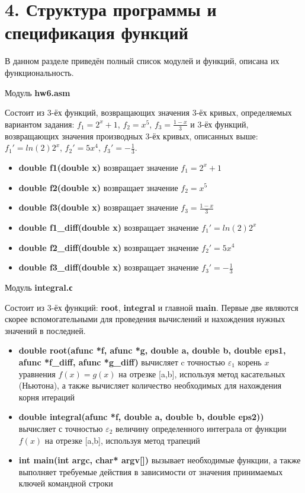\documentclass[a4paper,12pt,titlepage,finall]{article}
\begin{document}
\newpage

\section{4. Структура программы и спецификация функций}
В данном разделе приведён полный список модулей и функций, описана их функциональность.
\newline

\item{Модуль {\bf \ttfamily hw6.asm}}

Состоит из 3-ёх функций, возвращающих значения 3-ёх кривых, определяемых вариантом задания: $f_{1} = 2^x + 1$, $f_{2} = x^5$, $f_{3} = \frac{1-x}{3}$ и 3-ёх функций, возвращающих значения производных 3-ёх кривых, описанных выше: $f_{1}' = ln(2)2^x$, $f_{2}' = 5x^4$, $f_{3}' = -\frac{1}{3}$.
\begin{itemize}
    \item {\bf \ttfamily double f1(double x)} возвращает значение $f_{1} = 2^x + 1$
    \item {\bf \ttfamily double f2(double x)} возвращает значение $f_{2} = x^5$
    \item {\bf \ttfamily double f3(double x)} возвращает значение $f_{3} = \frac{1-x}{3}$
    \item {\bf \ttfamily double f1\_diff(double x)} возвращает значение $f_{1}' = ln(2)2^x$
    \item {\bf \ttfamily double f2\_diff(double x)} возвращает значение $f_{2}' = 5x^4$
    \item {\bf \ttfamily double f3\_diff(double x)} возвращает значение $f_{3}' = -\frac{1}{3}$
\end{itemize}
\item{Модуль {\bf \ttfamily integral.с}}

Состоит из 3-ёх функций: {\bf \ttfamily root}, {\bf \ttfamily integral} и главной {\bf \ttfamily main}. Первые две являются скорее вспомогательными для проведения вычислений и нахождения нужных значений в последней.
\begin{itemize}
\item {\bf \ttfamily double root(afunc *f, afunc *g, double a, double b, double eps1,  afunc *f\_diff, afunc *g\_diff)} вычисляет c точностью $\varepsilon_1$ корень $x$ уравнения $f(x) = g(x)$ на отрезке [a,b], используя метод касательных (Ньютона), а также вычисляет количество необходимых для нахождения корня итераций
\item {\bf \ttfamily double integral(afunc *f, double a, double b, double eps2))} вычисляет с точностью $\varepsilon_2$ величину определенного интеграла от функции $f(x)$ на отрезке [a,b], используя метод трапеций
\item {\bf \ttfamily int main(int argc, char* argv[])} вызывает необходимые функции, а также выполняет требуемые действия в зависимости от значения принимаемых ключей командной строки
\end{itemize}
\newline
\bigskip
\end{document}
